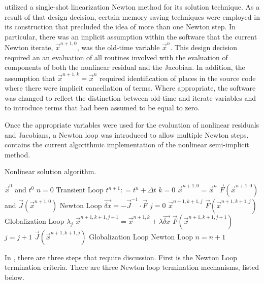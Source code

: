 \cobra{} utilized a single-shot linearization Newton method for its solution technique.
As a result of that design decision, certain memory saving techniques were employed in its construction that precluded the idea of more than one Newton step.
In particular, there was an implicit assumption within the software that the current Newton iterate, $\vec{x}^{n+1, 0}$, was the old-time variable $\vec{x}^{n}$.
This design decision required an an evaluation of all routines involved with the evaluation of components of both the nonlinear residual and the Jacobian.
In addition, the assumption that $\vec{x}^{n+1, k} = \vec{x}^{n}$ required identification of places in the source code where there were implicit cancellation of terms.
Where appropriate, the software was changed to reflect the distinction between old-time and iterate variables and to introduce terms that had been assumed to be equal to zero.

Once the appropriate variables were used for the evaluation of nonlinear residuals and Jacobians, a Newton loop was introduced to allow multiple Newton steps.
 contains the current algorithmic implementation of the nonlinear semi-implicit method.

\begin{algo}[H]
\caption{Nonlinear \cobra{} solution algorithm.}
\label{alg:nl_cobra}
\setlength{\baselineskip}{0.625\baselineskip}
\begin{algorithmic}[1]
\Require $\vec{x}^{0}$ and $t^{0}$
\Set $n = 0$
\Loop \; Transient Loop
    \State $t^{n+1} : = t^{n} + \Delta t$
    \State $k = 0$
    \State $\vec{x}^{n+1,0} = \vec{x}^{n}$
	\Calculate $\vec{F}(\vec{x}^{n+1,0})$ and $\vec{J}(\vec{x}^{n+1,0})$
    \Loop \; Newton Loop
		\Calculate $\vec{\delta x} = - \vec{J}^{-1}\cdot\vec{F}$
		$j = 0$		
		\Calculate $\vec{x}^{n+1,k+1,j}$
		\Calculate $\vec{F}(\vec{x}^{n+1,k+1,j})$
		\Loop \; Globalization Loop
				\Calculate $\lambda_j$
				\Calculate $\vec{x}^{n+1,k+1,j+1} = \vec{x}^{n+1,k} + \lambda \vec{\delta x}$
				\Calculate $\vec{F}(\vec{x}^{n+1,k+1,j+1})$
				\State $j = j + 1$			
			\Else
				\Calculate $\vec{J}(\vec{x}^{n+1,k+1,j})$
				\Exit Globalization Loop
			\EndIf
		\EndLoop			
			\Exit Newton Loop
		\EndIf
	\EndLoop
	\State $n = n + 1$
\EndLoop
\end{algorithmic}
\end{algo}

In , there are three steps that require discussion.
First is the Newton Loop termination criteria.
There are three Newton loop termination mechanisms, listed below.

